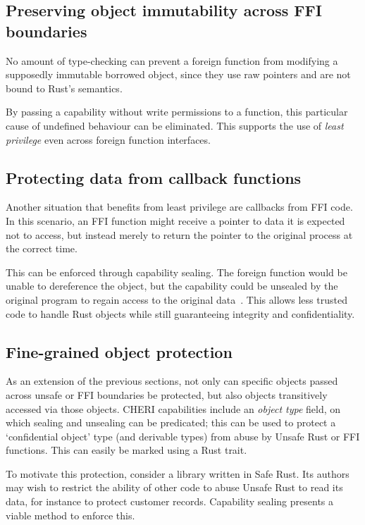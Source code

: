 \documentclass[dissertation.tex]{subfiles}
\begin{document}
\subsection{Preserving object immutability across FFI boundaries}
No amount of type-checking can prevent a foreign function from modifying
a supposedly immutable borrowed object, since they use raw pointers and
are not bound to Rust's semantics.

By passing a capability without write permissions to a function, this
particular cause of undefined behaviour can be eliminated.
This supports the use of \emph{least privilege} even across foreign
function interfaces.


\subsection{Protecting data from callback functions}
Another situation that benefits from least privilege are callbacks from
FFI code.
In this scenario, an FFI function might receive a pointer to data it is
expected not to access, but instead merely to return the pointer to the
original process at the correct time.

This can be enforced through capability sealing.
The foreign function would be unable to dereference the object, but the
capability could be unsealed by the original program to regain access to
the original data~\cite{cheri-v6}.
This allows less trusted code to handle Rust objects while still
guaranteeing integrity and confidentiality.


\subsection{Fine-grained object protection}
\label{sec:eval-capability-using-type}

As an extension of the previous sections, not only can specific objects
passed across unsafe or FFI boundaries be protected, but also objects
transitively accessed via those objects.
CHERI capabilities include an \emph{object type} field, on which sealing
and unsealing can be predicated; this can be used to protect a
`confidential object' type (and derivable types) from abuse by Unsafe
Rust or FFI functions.
This can easily be marked using a Rust trait.

To motivate this protection, consider a library written in Safe Rust.
Its authors may wish to restrict the ability of other code to abuse
Unsafe Rust to read its data, for instance to protect customer records.
Capability sealing presents a viable method to enforce this.
\end{document}
